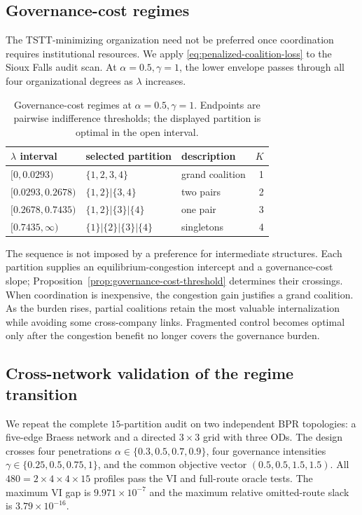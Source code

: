 \subsection{Governance-cost regimes}\label{sec:governance-cost-regimes}

The TSTT-minimizing organization need not be preferred once coordination
requires institutional resources. We apply \eqref{eq:penalized-coalition-loss}
to the Sioux Falls audit scan. At $\alpha=0.5,\gamma=1$, the lower envelope
passes through all four organizational degrees as $\lambda$ increases.

\begin{table}[!htbp]
\centering
\small
\caption{Governance-cost regimes at $\alpha=0.5,\gamma=1$. Endpoints are pairwise indifference thresholds; the displayed partition is optimal in the open interval.}
\label{tab:governance-regimes}
\begin{tabular}{lll r}
\toprule
$\lambda$ interval & selected partition & description & $K$\\
\midrule
$[0,0.0293)$ & $\{1,2,3,4\}$ & grand coalition & 1\\
$[0.0293,0.2678)$ & $\{1,2\}|\{3,4\}$ & two pairs & 2\\
$[0.2678,0.7435)$ & $\{1,2\}|\{3\}|\{4\}$ & one pair & 3\\
$[0.7435,\infty)$ & $\{1\}|\{2\}|\{3\}|\{4\}$ & singletons & 4\\
\bottomrule
\end{tabular}
\end{table}

The sequence is not imposed by a preference for intermediate structures. Each
partition supplies an equilibrium-congestion intercept and a governance-cost
slope; Proposition~\ref{prop:governance-cost-threshold} determines their
crossings. When coordination is inexpensive, the congestion gain justifies a
grand coalition. As the burden rises, partial coalitions retain the most
valuable internalization while avoiding some cross-company links. Fragmented
control becomes optimal only after the congestion benefit no longer covers the
governance burden.

\subsection{Cross-network validation of the regime transition}\label{sec:cross-network}

We repeat the complete $15$-partition audit on two independent BPR topologies:
a five-edge Braess network and a directed $3\times3$ grid with three ODs. The
design crosses four penetrations
$\alpha\in\{0.3,0.5,0.7,0.9\}$, four governance intensities
$\gamma\in\{0.25,0.5,0.75,1\}$, and the common objective vector
$(0.5,0.5,1.5,1.5)$. All $480=2\times4\times4\times15$ profiles pass the VI
and full-route oracle tests. The maximum VI gap is $9.971\times10^{-7}$ and
the maximum relative omitted-route slack is $3.79\times10^{-16}$.

